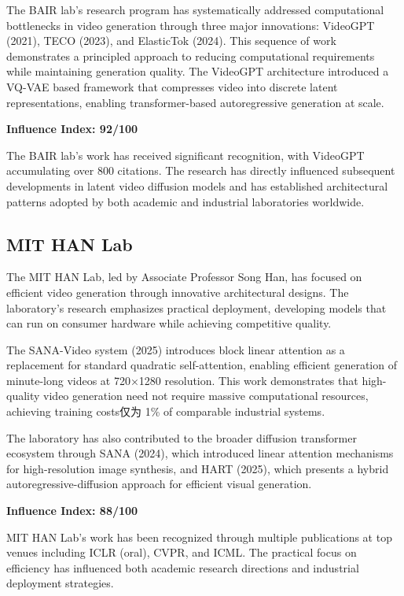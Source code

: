 The BAIR lab's research program has systematically addressed computational bottlenecks in video generation through three major innovations: VideoGPT (2021), TECO (2023), and ElasticTok (2024). This sequence of work demonstrates a principled approach to reducing computational requirements while maintaining generation quality. The VideoGPT architecture introduced a VQ-VAE based framework that compresses video into discrete latent representations, enabling transformer-based autoregressive generation at scale.

\textbf{Influence Index: 92/100}

The BAIR lab's work has received significant recognition, with VideoGPT accumulating over 800 citations. The research has directly influenced subsequent developments in latent video diffusion models and has established architectural patterns adopted by both academic and industrial laboratories worldwide.

\subsection{MIT HAN Lab}

The MIT HAN Lab, led by Associate Professor Song Han, has focused on efficient video generation through innovative architectural designs. The laboratory's research emphasizes practical deployment, developing models that can run on consumer hardware while achieving competitive quality.

The SANA-Video system (2025) introduces block linear attention as a replacement for standard quadratic self-attention, enabling efficient generation of minute-long videos at 720×1280 resolution. This work demonstrates that high-quality video generation need not require massive computational resources, achieving training costs仅为 1\% of comparable industrial systems.

The laboratory has also contributed to the broader diffusion transformer ecosystem through SANA (2024), which introduced linear attention mechanisms for high-resolution image synthesis, and HART (2025), which presents a hybrid autoregressive-diffusion approach for efficient visual generation.

\textbf{Influence Index: 88/100}

MIT HAN Lab's work has been recognized through multiple publications at top venues including ICLR (oral), CVPR, and ICML. The practical focus on efficiency has influenced both academic research directions and industrial deployment strategies.

